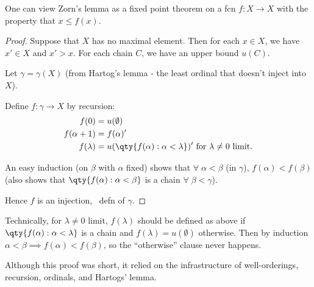 One can view Zorn's lemma as a fixed point theorem on a fcn $f \colon X \to X$ with the property that $x \leq f(x)$.

\begin{proof}
    Suppose that $X$ has no maximal element.
    Then for each $x \in X$, we have $x' \in X$ and $x' > x$.
    For each chain $C$, we have an upper bound $u(C)$.

    Let $\gamma = \gamma(X)$ (from Hartog's lemma - the least ordinal that doesn't inject into $X$).

    Define $f : \gamma \to X$ by recursion:
    \begin{align*}
        f(0) &= u(\emptyset) \\
        f(\alpha + 1) &= f(\alpha)' \\
        f(\lambda) &= u(\qty{f(\alpha) : \alpha < \lambda})' \text{ for $\lambda \neq 0$ limit}.
    \end{align*}

    An easy induction (on $\beta$ with $\alpha$ fixed) shows that $\forall \; \alpha < \beta$ (in $\gamma$), $f(\alpha) < f(\beta)$ (also shows that $\qty{f(\alpha) : \alpha < \beta}$ is a chain $\forall \; \beta < \gamma$).

    Hence $f$ is an injection, \Lightning \ defn of $\gamma$.
\end{proof}

\begin{remark}
    Technically, for $\lambda \neq 0$ limit, $f(\lambda)$ should be defined as above if $\qty{f(\alpha) : \alpha < \lambda}$ is a chain and $f(\lambda) = u(\emptyset)$ otherwise.
    Then by induction $\alpha < \beta \implies f(\alpha) < f(\beta)$, so the ``otherwise'' clause never happens.
\end{remark}

\begin{remark}
    Although this proof was short, it relied on the infrastructure of well-orderings, recursion, ordinals, and Hartogs' lemma.
\end{remark}

